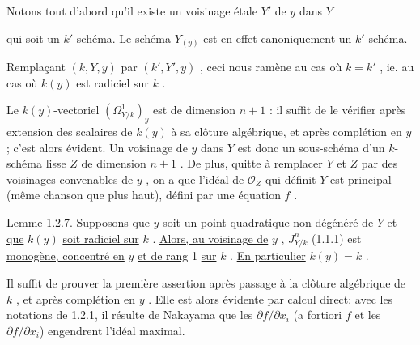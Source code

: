 Notons tout d'abord qu'il existe un voisinage étale $Y'$ de $y$ dans $Y$

\begin{center}
\end{center}
qui soit un $k'$-schéma. Le schéma $Y_{(y)}$ est en effet canoniquement un $k'$-schéma.



Remplaçant $(k,Y,y)$ par $(k',Y',y)$ , ceci nous ramène au cas où $k = k'$ , ie. au cas où $k(y)$ est radiciel sur $k$ .

Le $k(y)$-vectoriel $(\Omega^1_{Y/k})_y$ est de dimension $n+1$ : il suffit de le vérifier après extension des scalaires de $k(y)$ à sa clôture algébrique, et après complétion en $y$ ; c'est alors évident. Un voisinage de $y$ dans $Y$ est donc un sous-schéma d'un $k$-schéma lisse $Z$ de dimension $n+1$ . De plus, quitte à remplacer $Y$ et $Z$ par des voisinages convenables de $y$ , on a que l'idéal de $\mathcal{O}_Z$ qui définit $Y$ est principal (même chanson que plus haut), défini par une équation $f$ .

\underline{Lemme} 1.2.7. \underline{Supposons que} $y$ \underline{soit un point quadratique non dégénéré de} $Y$ \underline{et que} $k(y)$ \underline{soit radiciel sur} $k$ . \underline{Alors, au voisinage de} $y$ , $J^n_{Y/k}$ (1.1.1) est \underline{monogène, concentré en} $y$ \underline{et de rang} 1 \underline{sur} $k$ . \underline{En particulier} $k(y) = k$ .

Il suffit de prouver la première assertion après passage à la clôture algébrique de $k$ , et après complétion en $y$ . Elle est alors évidente par calcul direct: avec les notations de 1.2.1, il résulte de Nakayama que les $\partial f/\partial x_i$ (a fortiori $f$ et les $\partial f/\partial x_i$) engendrent l'idéal maximal.


